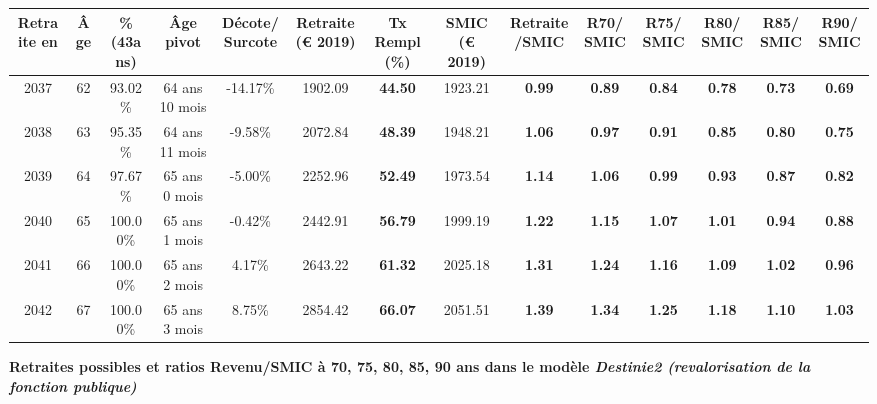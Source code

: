 \begin{adjustbox}{max width=\textwidth} 
\begin{tabular}[htb]{|c|c||c|c|c||c|c||c|c||c|c|c|c|c|} 
\hline 
 Retraite en &  Âge &  \%(43ans) &  Âge pivot &  Décote/Surcote &  Retraite (\euro{} 2019) &  Tx Rempl(\%) &  SMIC (\euro{} 2019) &  Retraite/SMIC &  R70/SMIC &  R75/SMIC &  R80/SMIC &  R85/SMIC &  R90/SMIC \\ 
\hline \hline 
 2037 &  62 &  93.02\% &  64 ans 10 mois &  -14.17\% &  1902.09 &  {\bf 44.50} &  1923.21 &  {\bf {\color{red} 0.99}} &  {\bf {\color{red} 0.89}} &  {\bf {\color{red} 0.84}} &  {\bf {\color{red} 0.78}} &  {\bf {\color{red} 0.73}} &  {\bf {\color{red} 0.69}} \\ 
\hline 
 2038 &  63 &  95.35\% &  64 ans 11 mois &  -9.58\% &  2072.84 &  {\bf 48.39} &  1948.21 &  {\bf 1.06} &  {\bf {\color{red} 0.97}} &  {\bf {\color{red} 0.91}} &  {\bf {\color{red} 0.85}} &  {\bf {\color{red} 0.80}} &  {\bf {\color{red} 0.75}} \\ 
\hline 
 2039 &  64 &  97.67\% &  65 ans 0 mois &  -5.00\% &  2252.96 &  {\bf 52.49} &  1973.54 &  {\bf 1.14} &  {\bf 1.06} &  {\bf {\color{red} 0.99}} &  {\bf {\color{red} 0.93}} &  {\bf {\color{red} 0.87}} &  {\bf {\color{red} 0.82}} \\ 
\hline 
 2040 &  65 &  100.00\% &  65 ans 1 mois &  -0.42\% &  2442.91 &  {\bf 56.79} &  1999.19 &  {\bf 1.22} &  {\bf 1.15} &  {\bf 1.07} &  {\bf 1.01} &  {\bf {\color{red} 0.94}} &  {\bf {\color{red} 0.88}} \\ 
\hline 
 2041 &  66 &  100.00\% &  65 ans 2 mois &  4.17\% &  2643.22 &  {\bf 61.32} &  2025.18 &  {\bf 1.31} &  {\bf 1.24} &  {\bf 1.16} &  {\bf 1.09} &  {\bf 1.02} &  {\bf {\color{red} 0.96}} \\ 
\hline 
 2042 &  67 &  100.00\% &  65 ans 3 mois &  8.75\% &  2854.42 &  {\bf 66.07} &  2051.51 &  {\bf 1.39} &  {\bf 1.34} &  {\bf 1.25} &  {\bf 1.18} &  {\bf 1.10} &  {\bf 1.03} \\ 
\hline 
\hline 
\end{tabular} 
\end{adjustbox} 
 
 \vspace{0.1cm} 
{\bf \noindent Retraites possibles et ratios Revenu/SMIC à 70, 75, 80, 85, 90 ans dans le modèle \emph{Destinie2 (revalorisation de la fonction publique)}}  
 
